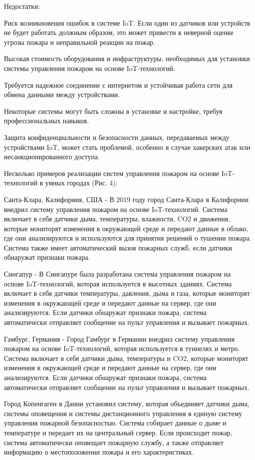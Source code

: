 \begin{multicols}{2}
Недостатки:

Риск возникновения ошибок в системе IoT. Если один из датчиков или
устройств не будет работать должным образом, это может привести к
неверной оценке угрозы пожара и неправильной реакции на пожар.

Высокая стоимость оборудования и инфраструктуры, необходимых для
установки системы управления пожаром на основе IoT-технологий.

Требуется надежное соединение с интернетом и устойчивая работа сети
для обмена данными между устройствами.

Некоторые системы могут быть сложны в установке и настройке, требуя
профессиональных навыков.

Защита конфиденциальности и безопасности данных, передаваемых между
устройствами IoT, может стать проблемой, особенно в случае хакерских
атак или несанкционированного доступа.

Несколько примеров реализации систем управления пожаром на основе
IoT-технологий в умных городах (Рис. 4):

Санта-Клара, Калифорния, США - В 2019 году город Санта-Клара в
Калифорнии внедрил систему управления пожаром на основе
IoT-технологий. Система включает в себя датчики дыма, температуры,
влажности, CO2 и движения, которые мониторят изменения в окружающей
среде и передают данные в облако, где они анализируются и используются
для принятия решений о тушении пожара. Система также имеет
автоматический вызов пожарных служб, если датчики обнаружат признаки
пожара.

Сингапур - В Сингапуре была разработана система управления пожаром на
основе IoT-технологий, которая используется в высотных зданиях.
Система включает в себя датчики температуры, давления, дыма и газа,
которые мониторят изменения в окружающей среде и передают данные на
сервер, где они анализируются. Если датчики обнаружат признаки пожара,
система автоматически отправляет сообщение на пульт управления и
вызывает пожарных.

Гамбург, Германия - Город Гамбург в Германии внедрил систему
управления пожаром на основе IoT-технологий, которая используется в
туннелях и метро. Система включает в себя датчики дыма, температуры и
CO2, которые мониторят изменения в окружающей среде и передают данные
на сервер, где они анализируются. Если датчики обнаружат признаки
пожара, система автоматически отправляет сообщение на пульт управления
и вызывает пожарных.

Город Копенгаген в Дании установил систему, которая объединяет датчики
дыма, системы оповещения и системы дистанционного управления в единую
систему управления пожарной безопасностью. Система собирает данные о
дыме и температуре и передает их на центральный сервер. Если
происходит пожар, система автоматически оповещает пожарную службу, а
также отправляет информацию о местоположении пожара и его
характеристиках.


\end{multicols}
